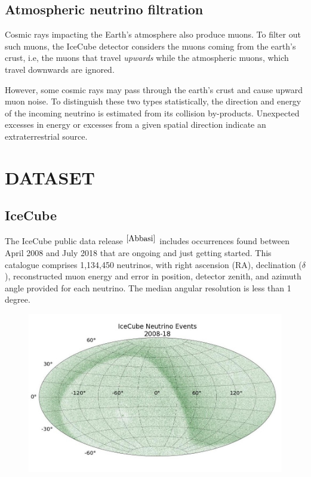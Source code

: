 \documentclass{article}
\begin{document}
\subsection{\large Atmospheric neutrino filtration}
Cosmic rays impacting the Earth's atmosphere also produce muons. To filter out such muons, the IceCube detector considers the muons coming from the earth's crust, i.e, the muons that travel \emph{upwards} while the atmospheric muons, which travel downwards are ignored.

However, some cosmic rays may pass through the earth's crust and cause upward muon noise. To distinguish these two types statistically, the direction and energy of the incoming neutrino is estimated from its collision by-products. Unexpected excesses in energy or excesses from a given spatial direction indicate an extraterrestrial source.

\newpage
\section{\Large DATASET}
\subsection{\large IceCube}
The IceCube public data release $^{\cite{Abbasi}}$ includes occurrences found between April 2008 and July 2018 that are ongoing and just getting started. This catalogue comprises 1,134,450 neutrinos, with right ascension (RA), declination ($\delta$), reconstructed muon energy and error in position, detector zenith, and azimuth angle provided for each neutrino. The median angular resolution is less than 1 degree.



\begin{figure}[!ht]
	\begin{center}
		\includegraphics[width=0.6\columnwidth]{Images/nu-map.jpg}
	\end{center}
	\label{fig:nusky}	
\end{figure}
\end{document}

